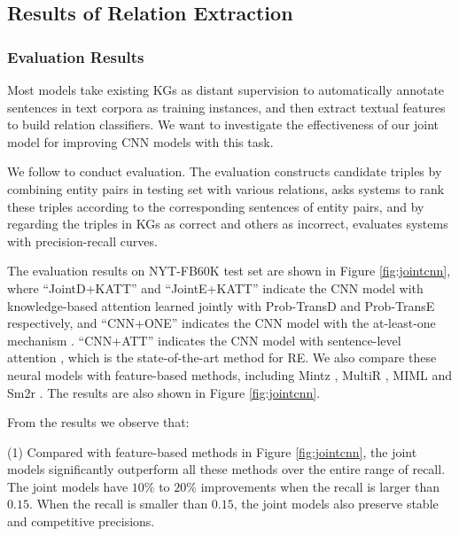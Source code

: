 \documentclass[letterpaper]{article} %
\begin{document}
\subsection{Results of Relation Extraction}

\subsubsection{Evaluation Results}

Most models \cite{mintz2009distant,riedel2010modeling,hoffmann2011knowledge,surdeanu2012multi,zeng2014relation,zeng2015distant,lin2016neural} take existing KGs as distant supervision to automatically annotate sentences in text corpora as training instances, and then extract textual features to build relation classifiers. We want to investigate the effectiveness of our joint model for improving CNN models with this task.

We follow \cite{weston2013connecting} to conduct evaluation. The evaluation constructs candidate triples by combining entity pairs in testing set with various relations, asks systems to rank these triples according to the corresponding sentences of entity pairs, and by regarding the triples in KGs as correct and others as incorrect, evaluates systems with precision-recall curves.

The evaluation results on NYT-FB60K test set are shown in Figure \ref{fig:jointcnn}, where ``JointD+KATT'' and ``JointE+KATT'' indicate the CNN model with knowledge-based attention learned jointly with Prob-TransD and Prob-TransE respectively, and ``CNN+ONE'' indicates the CNN model with the at-least-one mechanism \cite{zeng2015distant}. ``CNN+ATT'' indicates the CNN model with sentence-level attention \cite{lin2016neural}, which is the state-of-the-art method for RE. We also compare these neural models with feature-based methods, including Mintz \cite{mintz2009distant}, MultiR \cite{hoffmann2011knowledge}, MIML \cite{surdeanu2012multi} and Sm2r \cite{weston2013connecting}. The results are also shown in Figure \ref{fig:jointcnn}. 

From the results we observe that: 

(1) Compared with feature-based methods in Figure \ref{fig:jointcnn}, the joint models significantly outperform all these methods over the entire range of recall. The joint models have $10\%$ to $20\%$ improvements when the recall is larger than $0.15$. When the recall is smaller than $0.15$, the joint models also preserve stable and competitive precisions. 
\end{document}
